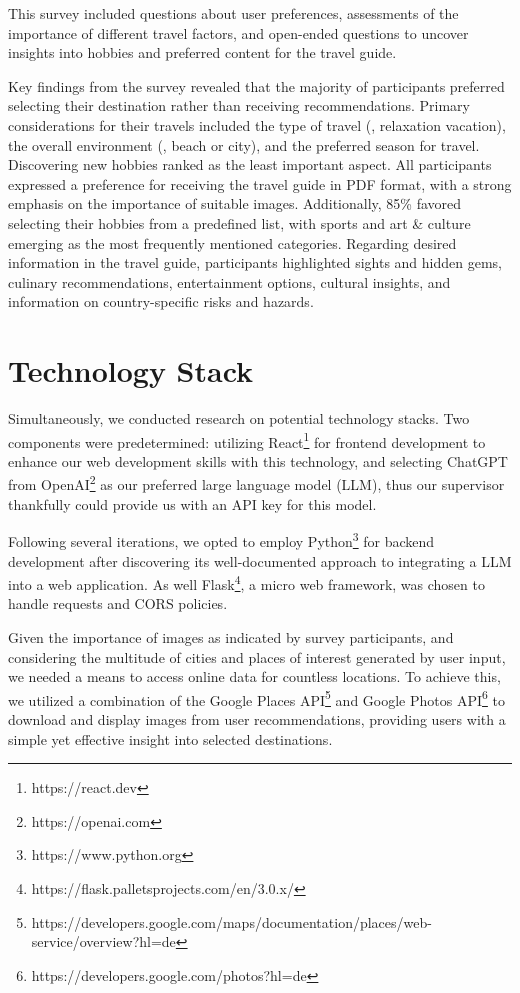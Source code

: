 \documentclass[english,notitlepage,smartquotes]{hgbreport}
\begin{document}
This survey included questions about user preferences, assessments of the importance of different travel factors, and open-ended questions to uncover insights into hobbies and preferred content for the travel guide.

Key findings from the survey revealed that the majority of participants preferred selecting their destination rather than receiving recommendations. Primary considerations for their travels included the type of travel (\eg, relaxation vacation), the overall environment (\eg, beach or city), and the preferred season for travel. Discovering new hobbies ranked as the least important aspect. All participants expressed a preference for receiving the travel guide in PDF format, with a strong emphasis on the importance of suitable images. Additionally, 85\% favored selecting their hobbies from a predefined list, with sports and art \& culture emerging as the most frequently mentioned categories. Regarding desired information in the travel guide, participants highlighted sights and hidden gems, culinary recommendations, entertainment options, cultural insights, and information on country-specific risks and hazards.

\section{Technology Stack}
Simultaneously, we conducted research on potential technology stacks. Two components were predetermined: utilizing React\footnote{https://react.dev} for frontend development to enhance our web development skills with this technology, and selecting ChatGPT from OpenAI\footnote{https://openai.com} as our preferred large language model (LLM), thus our supervisor thankfully could provide us with an API key for this model.

Following several iterations, we opted to employ Python\footnote{https://www.python.org} for backend development after discovering its well-documented approach to integrating a LLM into a web application. As well Flask\footnote{https://flask.palletsprojects.com/en/3.0.x/}, a micro web framework, was chosen to handle requests and CORS policies.

Given the importance of images as indicated by survey participants, and considering the multitude of cities and places of interest generated by user input, we needed a means to access online data for countless locations. To achieve this, we utilized a combination of the Google Places API\footnote{https://developers.google.com/maps/documentation/places/web-service/overview?hl=de} and Google Photos API\footnote{https://developers.google.com/photos?hl=de} to download and display images from user recommendations, providing users with a simple yet effective insight into selected destinations.
\end{document}
